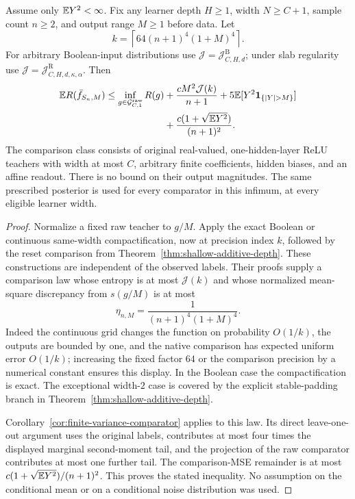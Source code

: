 \begin{theorem}
\label{thm:finite-variance-shallow-main}
Assume only $\mathbb E Y^2<\infty$. Fix any learner depth $H\ge1$, width $N\ge C+1$, sample count $n\ge2$, and output range $M\ge1$ before data. Let
\[
 k=\left\lceil64(n+1)^4(1+M)^4\right\rceil.
\]
For arbitrary Boolean-input distributions use $\mathcal J=\mathcal J^{\mathrm B}_{C,H,d}$; under slab regularity use $\mathcal J=\mathcal J^{\mathrm R}_{C,H,d,\kappa,\alpha}$. Then
\begin{align}
 \E R(\bar f_{S_n,M})\le\inf_{g\in\mathcal G^{\mathrm{raw}}_{C,1}}R(g)
 &+\frac{cM^2\mathcal J(k)}{n+1}
 +5\E[Y^2\mathbf1_{\{|Y|>M\}}]\notag\\
 &+\frac{c(1+\sqrt{\E Y^2})}{(n+1)^2}.
 \label{eq:finite-variance-shallow-main}
\end{align}
The comparison class consists of original real-valued, one-hidden-layer ReLU teachers with width at most $C$, arbitrary finite coefficients, hidden biases, and an affine readout. There is no bound on their output magnitudes. The same prescribed posterior is used for every comparator in this infimum, at every eligible learner width.
\end{theorem}
\begin{proof}
Normalize a fixed raw teacher to $g/M$. Apply the exact Boolean or continuous same-width compactification, now at precision index $k$, followed by the reset comparison from Theorem~\ref{thm:shallow-additive-depth}. These constructions are independent of the observed labels. Their proofs supply a comparison law whose entropy is at most $\mathcal J(k)$ and whose normalized mean-square discrepancy from $s(g/M)$ is at most
\[
 \eta_{n,M}=\frac1{(n+1)^4(1+M)^4}.
\]
Indeed the continuous grid changes the function on probability $O(1/k)$, the outputs are bounded by one, and the native comparison has expected uniform error $O(1/k)$; increasing the fixed factor $64$ or the comparison precision by a numerical constant ensures this display. In the Boolean case the compactification is exact. The exceptional width-$2$ case is covered by the explicit stable-padding branch in Theorem~\ref{thm:shallow-additive-depth}.

Corollary~\ref{cor:finite-variance-comparator} applies to this law. Its direct leave-one-out argument uses the original labels, contributes at most four times the displayed marginal second-moment tail, and the projection of the raw comparator contributes at most one further tail. The comparison-MSE remainder is at most $c(1+\sqrt{\mathbb E Y^2})/(n+1)^2$. This proves the stated inequality. No assumption on the conditional mean or on a conditional noise distribution was used.
\end{proof}

